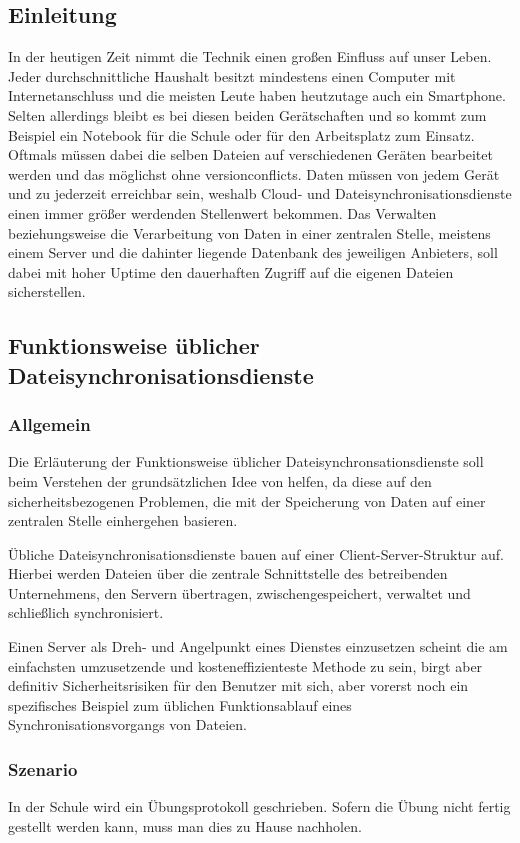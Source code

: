 \subsection{Einleitung}
In der heutigen Zeit nimmt die Technik einen großen Einfluss auf unser Leben.
Jeder durchschnittliche Haushalt besitzt mindestens einen Computer mit
Internetanschluss und die meisten Leute haben heutzutage auch ein Smartphone.
Selten allerdings bleibt es bei diesen beiden Gerätschaften und so kommt zum Beispiel
ein Notebook für die Schule oder für den Arbeitsplatz zum Einsatz. Oftmals
müssen dabei die selben Dateien auf verschiedenen Geräten bearbeitet werden und
das möglichst ohne \glspl{versionconflict}. Daten müssen von jedem
Gerät und zu jederzeit erreichbar sein, weshalb Cloud- und
Dateisynchronisationsdienste einen immer größer werdenden Stellenwert bekommen.
Das Verwalten beziehungsweise die Verarbeitung von Daten in einer
zentralen Stelle, meistens einem Server und die dahinter liegende Datenbank des
jeweiligen Anbieters, soll dabei mit hoher Uptime den dauerhaften Zugriff auf
die eigenen Dateien sicherstellen.

\subsection{Funktionsweise üblicher Dateisynchronisationsdienste}
\subsubsection{Allgemein}
Die Erläuterung der Funktionsweise üblicher Dateisynchronsationsdienste soll beim
Verstehen der grundsätzlichen Idee von \sblit helfen, da diese auf den
sicherheitsbezogenen Problemen, die mit der Speicherung von Daten auf einer
zentralen Stelle einhergehen basieren.

Übliche Dateisynchronisationsdienste bauen auf einer Client-Server-Struktur auf.
Hierbei werden Dateien über die zentrale Schnittstelle des betreibenden
Unternehmens, den Servern übertragen, zwischengespeichert, verwaltet und schließlich
synchronisiert.

Einen Server als Dreh- und Angelpunkt eines Dienstes einzusetzen scheint die am
einfachsten umzusetzende und kosteneffizienteste Methode zu sein, birgt aber
definitiv Sicherheitsrisiken für den Benutzer mit sich, aber vorerst noch ein
spezifisches Beispiel zum üblichen Funktionsablauf eines Synchronisationsvorgangs von
Dateien.

\subsubsection{Szenario}
In der Schule wird ein Übungsprotokoll geschrieben. Sofern die Übung nicht
fertig gestellt werden kann, muss man dies zu Hause nachholen.

